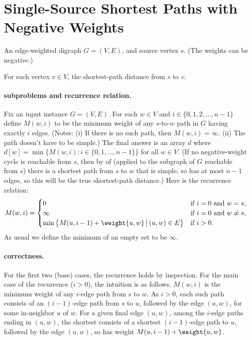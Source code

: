 
\section{Single-Source Shortest Paths with Negative Weights}\label{dp: sec: BF}

\begin{mylist}
\item[\bf input:]
  An edge-weighted digraph $G=(V,E)$, and source vertex $s$.   (The weights can be negative.)
  
\item[\bf output:]
  For each vertex $v\in V$, the shortest-path distance from $s$ to $v$.
\end{mylist}


\paragraph{subproblems and recurrence relation.}
Fix an input instance $G=(V,E)$. 
For each $w\in V$ and $i\in\{0, 1,2,\ldots,n-1\}$
define $M(w, i)$
to be the minimum weight of any $s$-to-$w$ path in $G$
having exactly $i$ edges.
(Notes: (i) If there is no such path, then $M(w, i) = \infty$.
(ii) The path doesn't have to be simple.)
The final answer is an array $d$
where $d[w] = \min\big\{M(w, i) : i\in\{0,1,\ldots, n-1\}\big\}$ for all $w\in V$.
(If no negative-weight cycle is reachable from $s$, then by  of 
(applied to the subgraph of $G$ reachable from $s$)
there is a shortest path from $s$ to $w$ that is simple, so has at most $n-1$ edges,
so this will be the true shortest-path distance.)
Here is the recurrence relation:
\[M(w,i) =
  \begin{cases}
    0 & \text{if } i=0 \text{ and } w=s, \\
    \infty & \text{if } i=0 \text{ and } w\ne s, \\
    \min \big\{ M(u, i-1) + \weight {u, w} \,\big|\, (u, w)\in E\big\} %
    & \text{if } i > 0.
  \end{cases}
\]
As usual we define the minimum of an empty set to be $\infty$.

\paragraph{correctness.}
For the first two (base) cases, the recurrence holds by inspection.
For the main case of the recurrence ($i> 0$), the intuition is as follows.
$M(w, i)$ is the minimum weight of any $i$-edge path from $s$ to $w$.
As $i>0$, each such path consists of an $(i-1)$-edge path from $s$ to $u$, followed by the edge $(u, w)$, for some in-neighbor $u$ of $w$.
For a given final edge $(u, w)$, among the $i$-edge paths ending in $(u, w)$,
the shortest consists of a shortest $(i-1)$-edge path to $u$, followed by the edge $(u, w)$,
so has weight $M(u, i-1) + \weight {u, w}$.


